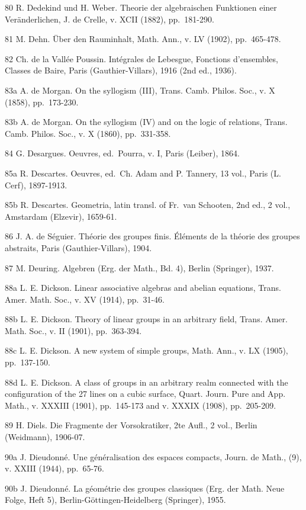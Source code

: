 80 R. Dedekind und H. Weber. Theorie der algebraischen Funktionen einer Veränderlichen, J. de Crelle, v. XCII (1882), pp.~181-290.

81 M. Dehn. Über den Rauminhalt, Math. Ann., v. LV (1902), pp.~465-478.

82 Ch. de la Vallée Poussin. Intégrales de Lebesgue, Fonctions d'ensembles, Classes de Baire, Paris (Gauthier-Villars), 1916 (2nd ed., 1936).

83a A. de Morgan. On the syllogism (III), Trans. Camb. Philos. Soc., v. X (1858), pp.~173-230.

83b A. de Morgan. On the syllogism (IV) and on the logic of relations, Trans. Camb. Philos. Soc., v. X (1860), pp.~331-358.

84 G. Desargues. Oeuvres, ed.~Pourra, v. I, Paris (Leiber), 1864.

85a R. Descartes. Oeuvres, ed.~Ch. Adam and P. Tannery, 13 vol., Paris (L. Cerf), 1897-1913.

85b R. Descartes. Geometria, latin transl. of Fr.~van Schooten, 2nd ed., 2 vol., Amstardam (Elzevir), 1659-61.

86 J. A. de Séguier. Théorie des groupes finis. Éléments de la théorie des groupes abstraits, Paris (Gauthier-Villars), 1904.

87 M. Deuring. Algebren (Erg. der Math., Bd. 4), Berlin (Springer), 1937.

88a L. E. Dickson. Linear associative algebras and abelian equations, Trans. Amer. Math. Soc., v. XV (1914), pp.~31-46.

88b L. E. Dickson. Theory of linear groups in an arbitrary field, Trans. Amer. Math. Soc., v. II (1901), pp.~363-394.

88c L. E. Dickson. A new system of simple groups, Math. Ann., v. LX (1905), pp.~137-150.

88d L. E. Dickson. A class of groups in an arbitrary realm connected with the configuration of the 27 lines on a cubic surface, Quart. Journ. Pure and App. Math., v. XXXIII (1901), pp.~145-173 and v. XXXIX (1908), pp.~205-209.

89 H. Diels. Die Fragmente der Vorsokratiker, 2te Aufl., 2 vol., Berlin (Weidmann), 1906-07.

90a J. Dieudonné. Une généralisation des espaces compacts, Journ. de Math., (9), v. XXIII (1944), pp.~65-76.

90b J. Dieudonné. La géométrie des groupes classiques (Erg. der Math. Neue Folge, Heft 5), Berlin-Göttingen-Heidelberg (Springer), 1955.

